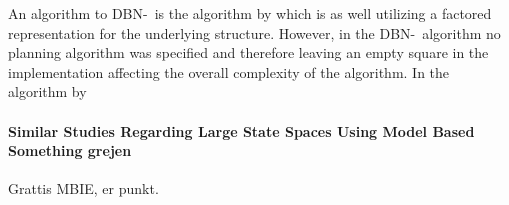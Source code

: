 An algorithm to DBN-\etre\ is the algorithm by \textcite{ross2012model} which is as well utilizing a factored representation for the underlying structure. However, in the DBN-\etre\ algorithm no planning algorithm was specified and therefore leaving an empty square in the implementation affecting the overall complexity of the algorithm. In the algorithm by \textcite{ross2012model} 


\paragraph{Similar Studies Regarding Large State Spaces Using Model Based Something grejen}
Grattis MBIE, er punkt.
